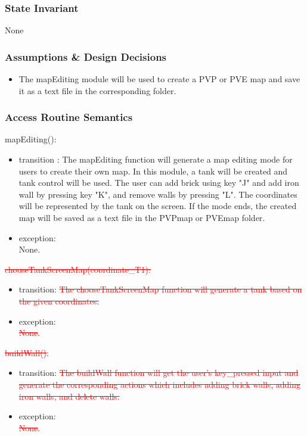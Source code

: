\documentclass[12pt, titlepage]{article}
\begin{document}
		\subsubsection{State Invariant}
		None
		
		\subsubsection{Assumptions \& Design Decisions}
		\begin{itemize}
		\item The mapEditing module will be used to create a PVP or PVE map and save it as a text file in the corresponding folder.
		\end{itemize}
		\subsubsection{Access Routine Semantics}
		mapEditing(): \\
		\begin{itemize}
		\item transition : The mapEditing function will generate a map editing mode for users to create their own map. In this module, a tank will be created and tank control will be used. The user can add brick using key "J" and add iron wall by pressing key "K", and remove walls by pressing "L". The coordinates will be represented by the tank on the screen. If the mode ends, the created map will be saved as a text file in the PVPmap or PVEmap folder.
		
		\item exception:\\None.
		\end{itemize}
		
		\textcolor{red}{\sout{chooseTankScreenMap(coordinate\_T1):}}\\
		\begin{itemize}
		\item transition: \textcolor{red}{\sout{The chooseTankScreenMap function will generate a tank based on the given coordinates.}}
		
		\item exception:\\\textcolor{red}{\sout{None}}.
		\end{itemize}
		
		\textcolor{red}{\sout{buildWall()}}:\\
		\begin{itemize}
		\item transition: \textcolor{red}{\sout{The buildWall function will get the user's key\_pressed input and generate the corresponding actions which includes adding brick walls, adding iron walls, and delete walls.}}
		
		\item exception:\\\textcolor{red}{\sout{None}}.
		\end{itemize}
\end{document}
